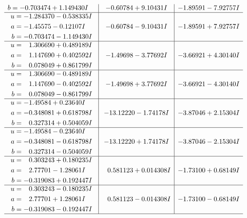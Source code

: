 \documentclass[1p]{elsarticle_modified}
\theoremstyle{definition}
\begin{document}
$$\begin{array}{c|c|c}
\begin{aligned}
b &= -0.703474 + 1.149430 I\end{aligned}
 & -0.60784 + 9.10431 I & -1.89591 - 7.92757 I \\ \hline\begin{aligned}
u &= -1.284370 - 0.538335 I \\
a &= -1.45575 - 0.12107 I \\
b &= -0.703474 - 1.149430 I\end{aligned}
 & -0.60784 - 9.10431 I & -1.89591 + 7.92757 I \\ \hline\begin{aligned}
u &= \phantom{-}1.306690 + 0.489189 I \\
a &= \phantom{-}1.147690 + 0.402592 I \\
b &= \phantom{-}0.078049 + 0.861799 I\end{aligned}
 & -1.49698 - 3.77692 I & -3.66921 + 4.30140 I \\ \hline\begin{aligned}
u &= \phantom{-}1.306690 - 0.489189 I \\
a &= \phantom{-}1.147690 - 0.402592 I \\
b &= \phantom{-}0.078049 - 0.861799 I\end{aligned}
 & -1.49698 + 3.77692 I & -3.66921 - 4.30140 I \\ \hline\begin{aligned}
u &= -1.49584 + 0.23640 I \\
a &= -0.348081 + 0.618798 I \\
b &= \phantom{-}0.327314 + 0.504059 I\end{aligned}
 & -13.12220 - 1.74178 I & -3.87046 + 2.15304 I \\ \hline\begin{aligned}
u &= -1.49584 - 0.23640 I \\
a &= -0.348081 - 0.618798 I \\
b &= \phantom{-}0.327314 - 0.504059 I\end{aligned}
 & -13.12220 + 1.74178 I & -3.87046 - 2.15304 I \\ \hline\begin{aligned}
u &= \phantom{-}0.303243 + 0.180235 I \\
a &= \phantom{-}2.77701 - 1.28061 I \\
b &= -0.319083 + 0.192447 I\end{aligned}
 & \phantom{-}0.581123 + 0.014308 I & -1.73100 + 0.68149 I \\ \hline\begin{aligned}
u &= \phantom{-}0.303243 - 0.180235 I \\
a &= \phantom{-}2.77701 + 1.28061 I \\
b &= -0.319083 - 0.192447 I\end{aligned}
 & \phantom{-}0.581123 - 0.014308 I & -1.73100 - 0.68149 I\\
 \hline 
 \end{array}$$\newpage\newpage\renewcommand{\arraystretch}{1}
\end{document}
